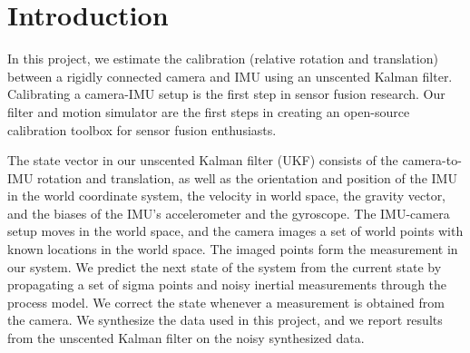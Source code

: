 \section{Introduction}

In this project, we estimate the calibration (relative rotation and translation) between a rigidly connected camera and IMU using an unscented Kalman filter. Calibrating a camera-IMU setup is the first step in sensor fusion research. Our filter and motion simulator are the first steps in creating an open-source calibration toolbox for sensor fusion enthusiasts. 

The state vector in our unscented Kalman filter (UKF) consists of the camera-to-IMU rotation and translation, as well as the orientation and position of the IMU in the world coordinate system, the velocity in world space, the gravity vector, and the biases of the IMU's accelerometer and the gyroscope. The IMU-camera setup moves in the world space, and the camera images a set of world points with known locations in the world space. The imaged points form the measurement in our system. We predict the next state of the system from the current state by propagating a set of sigma points and noisy inertial measurements through the process model. We correct the state whenever a measurement is obtained from the camera. We synthesize the data used in this project, and we report results from the unscented Kalman filter on the noisy synthesized data.
